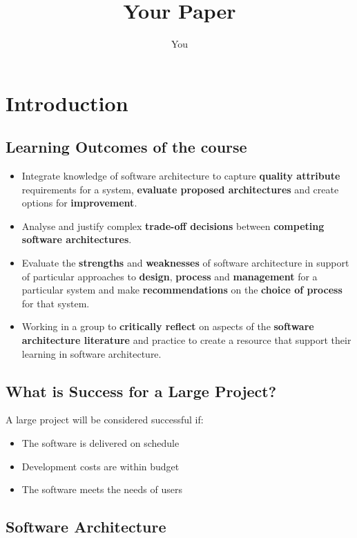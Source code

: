 \documentclass[a4paper]{report}
\title{Your Paper}
\author{You}
\begin{document}
\maketitle
\tableofcontents

\chapter{Introduction}
\section{Learning Outcomes of the course}
\begin{itemize}
\item Integrate knowledge of software architecture to capture \textbf{quality attribute} requirements for a system, \textbf{evaluate proposed architectures} and create options for \textbf{improvement}.

\item Analyse and justify complex \textbf{trade-off decisions} between \textbf{competing software architectures}.

\item Evaluate the \textbf{strengths} and \textbf{weaknesses} of software architecture in support of particular approaches to \textbf{design}, \textbf{process} and \textbf{management} for a particular system and make \textbf{recommendations} on the \textbf{choice of process} for that system.

\item Working in a group to \textbf{critically reflect} on aspects of the \textbf{software architecture literature} and practice to create a resource that support their learning in software architecture.
\end{itemize}

\section{What is Success for a Large Project?}
A large project will be considered successful if:
\begin{itemize}
\item The software is delivered on schedule
\item Development costs are within budget
\item The software meets the needs of users
\end{itemize}

\section{Software Architecture}
\end{document}
